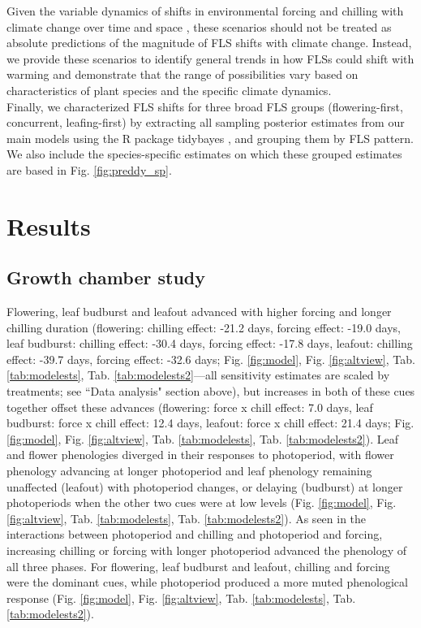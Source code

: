 \documentclass[12pt]{article}\usepackage[]{graphicx}\usepackage[]{color}
\begin{document}
\noindent Given the variable dynamics of shifts in environmental forcing and chilling with climate change over time and space \citep{Luedeling:2011aa}, these scenarios should not be treated as absolute predictions of the magnitude of FLS shifts with climate change. Instead, we provide these scenarios to identify general trends in how FLSs could shift with warming and demonstrate that the range of possibilities vary based on characteristics of plant species and the specific climate dynamics.\\

\noindent Finally, we characterized FLS shifts for three broad FLS groups (flowering-first, concurrent, leafing-first) by extracting all sampling posterior estimates from our main models using the R package tidybayes \citep{Kay2020}, and grouping them by FLS pattern. We also include the species-specific estimates on which these grouped estimates are based in Fig. \ref{fig:preddy_sp}.  \\ 

\section*{Results} 
\subsection*{Growth chamber study} 
\noindent  Flowering, leaf budburst and leafout advanced with higher forcing and longer chilling duration (flowering: chilling effect: -21.2 days, forcing effect: -19.0 days, leaf budburst: chilling effect: -30.4 days, forcing effect: -17.8 days, leafout: chilling effect: -39.7 days, forcing effect: -32.6 days; Fig. \ref{fig:model}, Fig. \ref{fig:altview}, Tab. \ref{tab:modelests}, Tab. \ref{tab:modelests2}---all sensitivity estimates are scaled by treatments; see ``Data analysis" section above), but increases in both of these cues together offset these advances (flowering: force x chill effect: 7.0 days, leaf budburst: force x chill effect: 12.4 days, leafout: force x chill effect: 21.4 days; Fig. \ref{fig:model}, Fig. \ref{fig:altview}, Tab. \ref{tab:modelests}, Tab. \ref{tab:modelests2}). Leaf and flower phenologies diverged in their responses to photoperiod, with flower phenology advancing at longer photoperiod and leaf phenology remaining unaffected (leafout) with photoperiod changes, or delaying (budburst) at longer photoperiods when the other two cues were at low levels (Fig. \ref{fig:model}, Fig. \ref{fig:altview}, Tab. \ref{tab:modelests}, Tab. \ref{tab:modelests2}). As seen in the interactions between photoperiod and chilling and photoperiod and forcing, increasing chilling or forcing with longer photoperiod advanced the phenology of all three phases. For flowering, leaf budburst and leafout, chilling and forcing were the dominant cues, while photoperiod produced a more muted phenological response (Fig. \ref{fig:model}, Fig. \ref{fig:altview}, Tab. \ref{tab:modelests}, Tab. \ref{tab:modelests2}). \\
\end{document}
